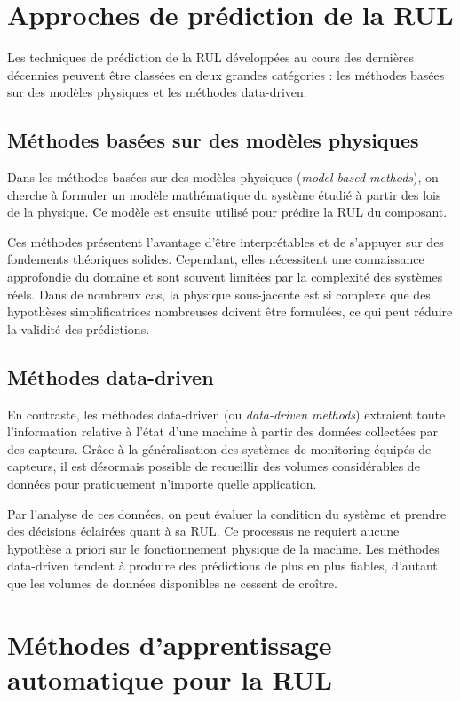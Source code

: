 \documentclass[12pt,a4paper]{report}
\theoremstyle{definition}
\begin{document}
\section{Approches de prédiction de la RUL}

Les techniques de prédiction de la RUL développées au cours des dernières décennies peuvent être classées en deux grandes catégories : les méthodes basées sur des modèles physiques et les méthodes data-driven.

\subsection{Méthodes basées sur des modèles physiques}

Dans les méthodes basées sur des modèles physiques (\emph{model-based methods}), on cherche à formuler un modèle mathématique du système étudié à partir des lois de la physique. Ce modèle est ensuite utilisé pour prédire la RUL du composant.

Ces méthodes présentent l'avantage d'être interprétables et de s'appuyer sur des fondements théoriques solides. Cependant, elles nécessitent une connaissance approfondie du domaine et sont souvent limitées par la complexité des systèmes réels. Dans de nombreux cas, la physique sous-jacente est si complexe que des hypothèses simplificatrices nombreuses doivent être formulées, ce qui peut réduire la validité des prédictions.

\subsection{Méthodes data-driven}

En contraste, les méthodes data-driven (ou \emph{data-driven methods}) extraient toute l'information relative à l'état d'une machine à partir des données collectées par des capteurs. Grâce à la généralisation des systèmes de monitoring équipés de capteurs, il est désormais possible de recueillir des volumes considérables de données pour pratiquement n'importe quelle application.

Par l'analyse de ces données, on peut évaluer la condition du système et prendre des décisions éclairées quant à sa RUL. Ce processus ne requiert aucune hypothèse a priori sur le fonctionnement physique de la machine. Les méthodes data-driven tendent à produire des prédictions de plus en plus fiables, d'autant que les volumes de données disponibles ne cessent de croître.

\section{Méthodes d'apprentissage automatique pour la RUL}
\end{document}
